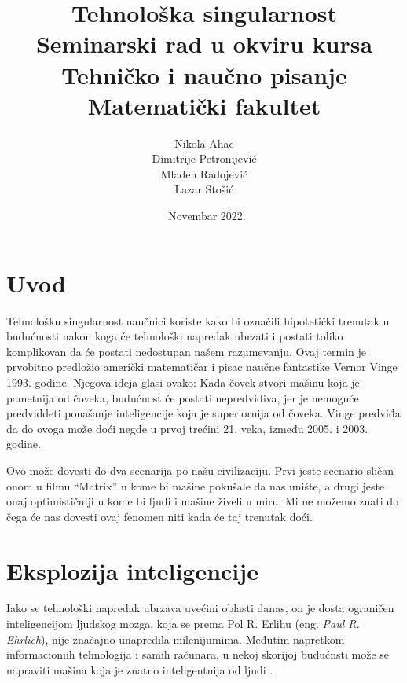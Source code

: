 \documentclass[a4paper]{article}
\begin{document}
\title{Tehnološka singularnost\\ \small{Seminarski rad u okviru kursa\\Tehničko i naučno pisanje\\ Matematički fakultet}}

\author{Nikola Ahac\\ Dimitrije Petronijević\\ Mladen Radojević\\ Lazar Stošić}
\date{~Novembar 2022.}
\maketitle



\tableofcontents

\newpage

\section{Uvod}
\label{sec:uvod}
Tehnološku singularnost naučnici koriste kako bi označili hipotetički trenutak u budućnosti nakon koga će tehnološki napredak ubrzati i postati toliko komplikovan da će postati nedostupan našem razumevanju. Ovaj termin je prvobitno predložio američki matematičar i pisac naučne fantastike Vernor Vinge 1993. godine. Njegova ideja glasi ovako: Kada čovek stvori mašinu koja je pametnija od čoveka, budućnost će postati nepredvidiva, jer je nemoguće predviddeti ponašanje inteligencije koja je superiornija od čoveka. Vinge predviđa da do ovoga može doći negde u prvoj trećini 21. veka, između 2005. i 2003. godine. 

Ovo može dovesti do dva scenarija po našu civilizaciju. Prvi jeste scenario sličan onom u filmu “Matrix” u kome bi mašine pokušale da nas unište, a drugi jeste onaj optimističniji u kome bi ljudi i mašine živeli u miru. Mi ne možemo znati do čega će nas dovesti ovaj fenomen niti kada će taj trenutak doći.

\section{Eksplozija inteligencije}
Iako se tehnološki napredak ubrzava uvećini oblasti danas, on je dosta ograničen inteligencijom ljudskog mozga, koja se prema Pol R. Erlihu (eng. \textit{Paul R. Ehrlich}), nije značajno unapredila milenijumima.\cite{ref 1} Međutim napretkom informacioniih tehnologija i samih računara, u nekoj skorijoj budućnsti može se napraviti mašina koja je znatno inteligentnija od ljudi .
\end{document}
